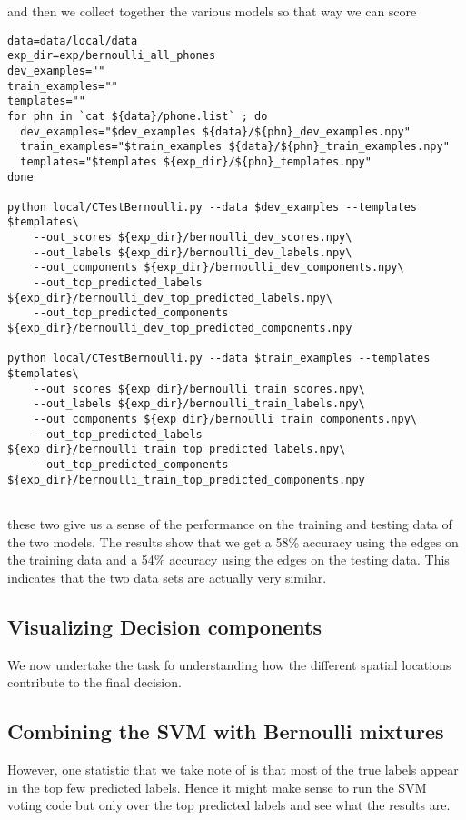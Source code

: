 \documentclass{article}
\begin{document}
and then we collect together the various models so that way
we can score

\begin{verbatim}
data=data/local/data
exp_dir=exp/bernoulli_all_phones
dev_examples=""
train_examples=""
templates=""
for phn in `cat ${data}/phone.list` ; do
  dev_examples="$dev_examples ${data}/${phn}_dev_examples.npy"
  train_examples="$train_examples ${data}/${phn}_train_examples.npy"
  templates="$templates ${exp_dir}/${phn}_templates.npy"
done

python local/CTestBernoulli.py --data $dev_examples --templates $templates\
    --out_scores ${exp_dir}/bernoulli_dev_scores.npy\
    --out_labels ${exp_dir}/bernoulli_dev_labels.npy\
    --out_components ${exp_dir}/bernoulli_dev_components.npy\
    --out_top_predicted_labels ${exp_dir}/bernoulli_dev_top_predicted_labels.npy\
    --out_top_predicted_components ${exp_dir}/bernoulli_dev_top_predicted_components.npy

python local/CTestBernoulli.py --data $train_examples --templates $templates\
    --out_scores ${exp_dir}/bernoulli_train_scores.npy\
    --out_labels ${exp_dir}/bernoulli_train_labels.npy\
    --out_components ${exp_dir}/bernoulli_train_components.npy\
    --out_top_predicted_labels ${exp_dir}/bernoulli_train_top_predicted_labels.npy\
    --out_top_predicted_components ${exp_dir}/bernoulli_train_top_predicted_components.npy


\end{verbatim}
these two give us a sense of the performance on the training and
testing data of the two models.  The results show that we get
a 58\% accuracy using the edges on the training data and a
54\% accuracy using the edges on the testing data. This indicates
that the two data sets are actually very similar.

\subsection{Visualizing Decision components}

We now undertake the task fo understanding how the different spatial
locations contribute to the final decision.

\subsection{Combining the SVM with Bernoulli mixtures}
However, one statistic that we take note of is that most
of the true labels appear in the top few predicted labels. 
Hence it might make sense to run the SVM voting code but only
over the top predicted labels and see what the results are.
\end{document}
